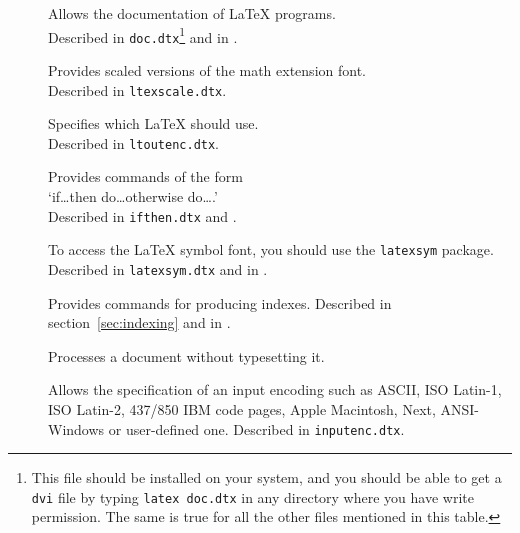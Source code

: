 \begin{table}[btp]
\caption{Some of the Packages Distributed with \LaTeX.} \label{packages}
\begin{lined}{\textwidth}
\begin{description}
\item[\normalfont{}] Allows the documentation of \LaTeX{} programs.\\
 Described in \texttt{doc.dtx}\footnote{This file should be installed
   on your system, and you should be able to get a \texttt{dvi} file
   by typing \texttt{latex doc.dtx} in any directory where you have
   write permission. The same is true for all the
   other files mentioned in this table.}  and in \companion.

\item[\normalfont{}] Provides scaled versions of the
  math extension  font.\\ 
  Described in \texttt{ltexscale.dtx}.

\item[\normalfont{}] Specifies which 
  \LaTeX{} should use.\\
  Described in \texttt{ltoutenc.dtx}.

\item[\normalfont{}] Provides commands of the form\\ 
  `if\ldots then do\ldots otherwise do\ldots.'\\ Described in
  \texttt{ifthen.dtx} and \companion.

\item[\normalfont{}] To access the \LaTeX{} symbol
  font, you should use the \texttt{latexsym} package. Described in
  \texttt{latexsym.dtx} and in \companion.
 
\item[\normalfont{}] Provides commands for producing
  indexes.  Described in section~\ref{sec:indexing} and in \companion.

\item[\normalfont{}] Processes a document without
  typesetting it.
  
\item[\normalfont{}] Allows the specification of an
  input encoding such as ASCII, ISO Latin-1, ISO Latin-2, 437/850 IBM
  code pages,  Apple Macintosh, Next, ANSI-Windows or user-defined one.
  Described in \texttt{inputenc.dtx}. 
\end{description}
\end{lined}
\end{table}


